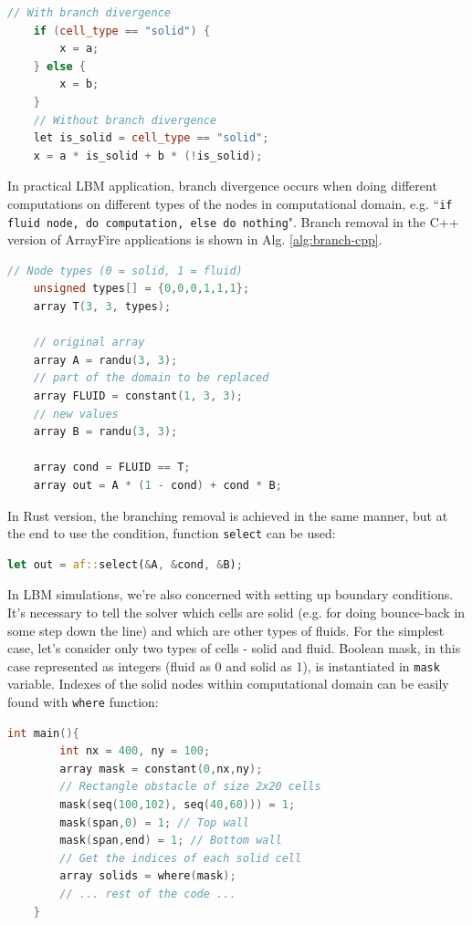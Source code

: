 \begin{lstlisting}[language=Cpp, caption=Pseudo-code showcasing the removal of branch divergence by removing if statement., label=alg:branch-pseudo]
	// With branch divergence
	if (cell_type == "solid") {
		x = a;
	} else {
		x = b;
	}
	// Without branch divergence
	let is_solid = cell_type == "solid";
	x = a * is_solid + b * (!is_solid);
\end{lstlisting}

In practical LBM application, branch divergence occurs when doing different computations on different types of the nodes in computational domain, e.g. ``\texttt{if fluid node, do computation, else do nothing}". Branch removal in the C++ version of ArrayFire applications is shown in Alg. \ref{alg:branch-cpp}.

\begin{lstlisting}[language=Cpp, caption=Pseudocode of removing branch divergence using ArrayFire., label=alg:branch-cpp]
	// Node types (0 = solid, 1 = fluid)
	unsigned types[] = {0,0,0,1,1,1};
	array T(3, 3, types);
	
	// original array
	array A = randu(3, 3);
	// part of the domain to be replaced
	array FLUID = constant(1, 3, 3);
	// new values
	array B = randu(3, 3);
	
	array cond = FLUID == T;
	array out = A * (1 - cond) + cond * B;
\end{lstlisting}

In Rust version, the branching removal is achieved in the same manner, but at the end to use the condition, function \texttt{select} can be used:

\begin{lstlisting}[language=Rust, caption=Example Rust code of removing branch divergence using ArrayFire., label=alg:branch-rust]
	let out = af::select(&A, &cond, &B);
\end{lstlisting}

In LBM simulations, we're also concerned with setting up boundary conditions. It's necessary to tell the solver which cells are solid (e.g. for doing bounce-back in some step down the line) and which are other types of fluids. For the simplest case, let's consider only two types of cells - solid and fluid. Boolean mask, in this case represented as integers (fluid as 0 and solid as 1), is instantiated in \texttt{mask} variable. Indexes of the solid nodes within computational domain can be easily found with \texttt{where} function:

\begin{lstlisting}[language=Cpp, caption=Pseudocode for constructiong the index of all solid cells using ArrayFire.]
	int main(){
		int nx = 400, ny = 100;
		array mask = constant(0,nx,ny);
		// Rectangle obstacle of size 2x20 cells
		mask(seq(100,102), seq(40,60))) = 1;
		mask(span,0) = 1; // Top wall
		mask(span,end) = 1; // Bottom wall
		// Get the indices of each solid cell
		array solids = where(mask);
		// ... rest of the code ...
	}
\end{lstlisting}

